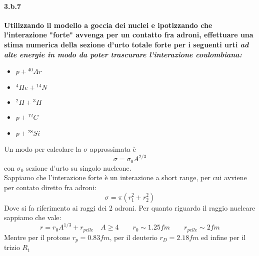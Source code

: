 \documentclass[twoside]{article}
\begin{document}
\paragraph{3.b.7}\textbf{Utilizzando il modello a goccia dei nuclei e ipotizzando che l'interazione "forte" avvenga per un contatto fra adroni, effettuare una stima numerica della sezione d'urto totale forte per i seguenti urti \textit{ad alte energie in modo da poter trascurare l'interazione coulombiana:}}
\begin{itemize}
    \item $p+{}^{40}Ar$
    \item ${}^4He+{}^{14}N$
    \item ${}^2H+{}^3H$
    \item $p+{}^{12}C$
    \item $p+{}^{28}Si$
\end{itemize}
Un modo per calcolare la $\sigma$ approssimata è 
\begin{equation}
    \sigma=\sigma_0 A^{2/3}
\end{equation}
con $\sigma_0$ sezione d'urto su singolo nucleone.\\
Sappiamo che l'interazione forte è un interazione a short range, per cui avviene per contato diretto fra adroni:
\begin{equation}
    \sigma=\pi (r_1^2+r_2^2)
\end{equation}
Dove si fa riferimento ai raggi dei 2 adroni. Per quanto riguardo il raggio nucleare sappiamo che vale:
\begin{equation}
    r=r_0A^{1/3}+r_{pelle} \quad A\ge 4 \qquad r_0\sim1.25 fm\qquad r_{pelle}\sim 2 fm
\end{equation}
Mentre per il protone $r_{p}=0.83 fm$, per il deuterio $r_D=2.18 fm$ ed infine per il trizio $R_t$
\end{document}
